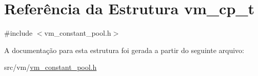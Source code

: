 \hypertarget{structvm__cp__t}{}\section{Referência da Estrutura vm\+\_\+cp\+\_\+t}
\label{structvm__cp__t}


{\ttfamily \#include $<$vm\+\_\+constant\+\_\+pool.\+h$>$}



A documentação para esta estrutura foi gerada a partir do seguinte arquivo\+:\begin{DoxyCompactItemize}
\item 
src/vm/\hyperlink{vm__constant__pool_8h}{vm\+\_\+constant\+\_\+pool.\+h}\end{DoxyCompactItemize}

